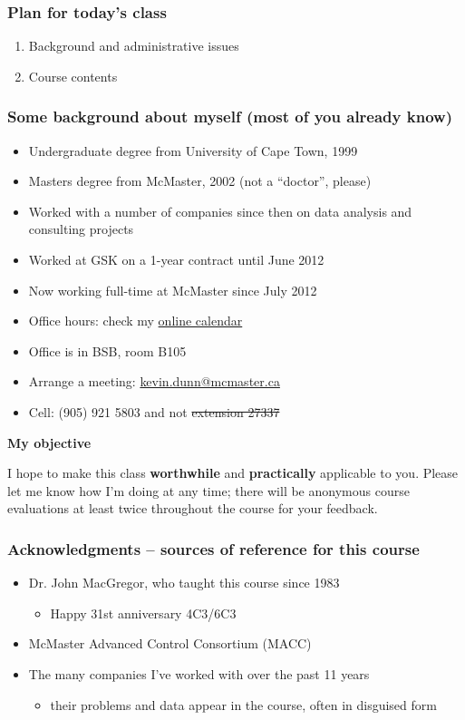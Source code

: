 \begin{frame}\frametitle{Plan for today's class}
	\begin{enumerate}
		\item	Background and administrative issues
		\item	Course contents
	\end{enumerate}
\end{frame}

\begin{frame}\frametitle{Some background about myself (most of you already know)}
	\begin{itemize}
		\item	Undergraduate degree from University of Cape Town, 1999
		\item	Masters degree from McMaster, 2002 (not a ``doctor'', please)
		\item	Worked with a number of companies since then on data analysis and consulting projects
		\item	Worked at GSK on a 1-year contract until June 2012
		\item	Now working full-time at McMaster since July 2012
		\item	Office hours: check my \href{http://learnche.mcmaster.ca/contact-info}{online calendar}
		\item	Office is in BSB, room B105
		\item	Arrange a meeting: \url{kevin.dunn@mcmaster.ca}
		\item	Cell: (905) 921 5803 and not \sout{extension 27337}
	\end{itemize}

	\vspace{12pt}
	\textbf{My objective}

	\vspace{6pt}
	I hope to make this class \textbf{worthwhile} and \textbf{practically} applicable to you. Please let me know how I'm doing at any time; there will be anonymous course evaluations at least twice throughout the course for your feedback.
\end{frame}

\begin{frame}\frametitle{Acknowledgments -- sources of reference for this course}
	\begin{itemize}
		\item	Dr. John MacGregor, who taught this course since 1983
		\begin{itemize}
			\item	Happy 31st anniversary 4C3/6C3
		\end{itemize}
		\item	McMaster Advanced Control Consortium (MACC)
		\item	The many companies I've worked with over the past 11 years
			\begin{itemize}
				\item	their problems and data appear in the course, often in disguised form
			\end{itemize}
	\end{itemize}
\end{frame}

